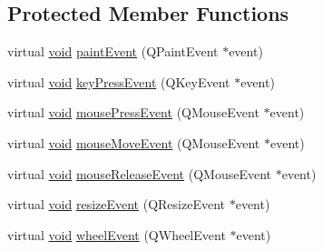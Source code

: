 \subsection*{Protected Member Functions}
\begin{DoxyCompactItemize}
\item 
virtual \hyperlink{group___u_a_v_objects_plugin_ga444cf2ff3f0ecbe028adce838d373f5c}{void} \hyperlink{class_qxt_flow_view_a8c12a6acd4c90bcf698c80b69aaa2148}{paint\-Event} (Q\-Paint\-Event $\ast$event)
\item 
virtual \hyperlink{group___u_a_v_objects_plugin_ga444cf2ff3f0ecbe028adce838d373f5c}{void} \hyperlink{class_qxt_flow_view_a7e61b46547b39c27678962c088324680}{key\-Press\-Event} (Q\-Key\-Event $\ast$event)
\item 
virtual \hyperlink{group___u_a_v_objects_plugin_ga444cf2ff3f0ecbe028adce838d373f5c}{void} \hyperlink{class_qxt_flow_view_a7bc32365e94d88bb21f63970c6478ae1}{mouse\-Press\-Event} (Q\-Mouse\-Event $\ast$event)
\item 
virtual \hyperlink{group___u_a_v_objects_plugin_ga444cf2ff3f0ecbe028adce838d373f5c}{void} \hyperlink{class_qxt_flow_view_a0a2e6bced823a5c1611836e3b4d2133f}{mouse\-Move\-Event} (Q\-Mouse\-Event $\ast$event)
\item 
virtual \hyperlink{group___u_a_v_objects_plugin_ga444cf2ff3f0ecbe028adce838d373f5c}{void} \hyperlink{class_qxt_flow_view_aa7e3b6dd3d5f896d088ea9b14b513509}{mouse\-Release\-Event} (Q\-Mouse\-Event $\ast$event)
\item 
virtual \hyperlink{group___u_a_v_objects_plugin_ga444cf2ff3f0ecbe028adce838d373f5c}{void} \hyperlink{class_qxt_flow_view_a86e70d0f95908058d9490164ba370ff9}{resize\-Event} (Q\-Resize\-Event $\ast$event)
\item 
virtual \hyperlink{group___u_a_v_objects_plugin_ga444cf2ff3f0ecbe028adce838d373f5c}{void} \hyperlink{class_qxt_flow_view_a798714df45766658e16d0c5625317096}{wheel\-Event} (Q\-Wheel\-Event $\ast$event)
\end{DoxyCompactItemize}
